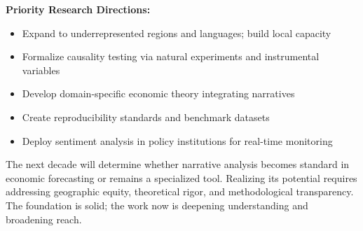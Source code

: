 \documentclass[12pt,a4paper]{article}
\begin{document}
\textbf{Priority Research Directions:}
\begin{itemize}
\item Expand to underrepresented regions and languages; build local capacity
\item Formalize causality testing via natural experiments and instrumental variables
\item Develop domain-specific economic theory integrating narratives
\item Create reproducibility standards and benchmark datasets
\item Deploy sentiment analysis in policy institutions for real-time monitoring
\end{itemize}

The next decade will determine whether narrative analysis becomes standard in economic forecasting or remains a specialized tool. Realizing its potential requires addressing geographic equity, theoretical rigor, and methodological transparency. The foundation is solid; the work now is deepening understanding and broadening reach.



\end{document}
